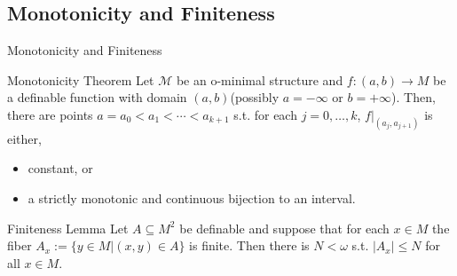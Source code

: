 \subsection{Monotonicity and Finiteness}

\begin{frame}[c]{Monotonicity and Finiteness}
	\begin{block}{Monotonicity Theorem \citep{pillay1986definable}}
		Let $\mathcal{M}$ be an o-minimal structure and $f:(a,b) \to M$ be a definable function with domain $(a,b)$(possibly $a=- \infty$ or $b=+ \infty$).
		Then, there are points $a=a_0<a_1< \cdots <a_{k+1}$ s.t. for each $j=0,\ldots,k$, $f|_{(a_j,a_{j+1})}$ is either,
		\begin{itemize}
			\item constant, or
			\item a strictly monotonic and continuous bijection to an interval.
		\end{itemize}
 	\end{block}

 	\begin{beamerboxesrounded}[shadow=true]{Finiteness Lemma \citep{knight1986definable}}
 		Let $A \subseteq M^2$ be definable and suppose that for each $x \in M$ the fiber $A_x := \{ y \in M|(x,y) \in A \}$ is finite.
		Then there is $N < \omega$ s.t. $|A_x| \leq N$ for all $x \in M$. 
 	\end{beamerboxesrounded}
\end{frame}



